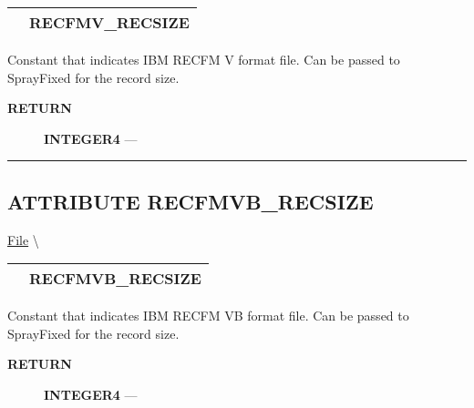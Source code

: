 {\renewcommand{\arraystretch}{1.5}
\begin{tabularx}{\textwidth}{|>{\raggedright\arraybackslash}l|X|}
\hline
\hspace{0pt}\mytexttt{\color{red} } & \textbf{RECFMV\_RECSIZE} \\
\hline
\end{tabularx}
}

\par





Constant that indicates IBM RECFM V format file. Can be passed to SprayFixed for the record size.








\par
\begin{description}
\item [\colorbox{tagtype}{\color{white} \textbf{\textsf{RETURN}}}] \textbf{INTEGER4} --- 
\end{description}




\rule{\linewidth}{0.5pt}
\subsection*{\textsf{\colorbox{headtoc}{\color{white} ATTRIBUTE}
RECFMVB\_RECSIZE}}

\hypertarget{ecldoc:file.recfmvb_recsize}{}
\hspace{0pt} \hyperlink{ecldoc:File}{File} \textbackslash 

{\renewcommand{\arraystretch}{1.5}
\begin{tabularx}{\textwidth}{|>{\raggedright\arraybackslash}l|X|}
\hline
\hspace{0pt}\mytexttt{\color{red} } & \textbf{RECFMVB\_RECSIZE} \\
\hline
\end{tabularx}
}

\par





Constant that indicates IBM RECFM VB format file. Can be passed to SprayFixed for the record size.








\par
\begin{description}
\item [\colorbox{tagtype}{\color{white} \textbf{\textsf{RETURN}}}] \textbf{INTEGER4} --- 
\end{description}





